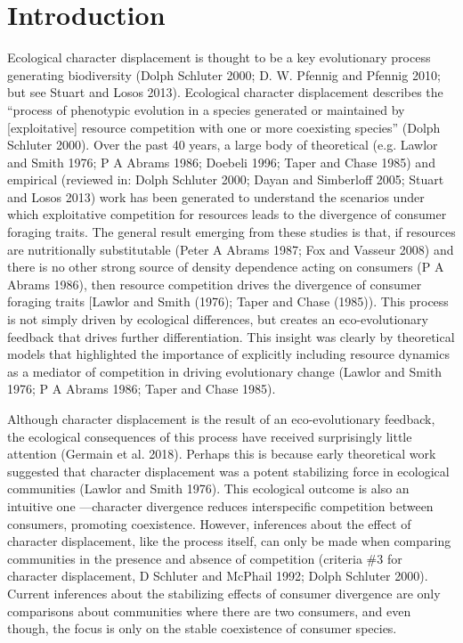 \documentclass[11pt,]{article}
\begin{document}
\newpage

\section{Introduction}\label{introduction}

Ecological character displacement is thought to be a key evolutionary
process generating biodiversity (Dolph Schluter 2000; D. W. Pfennig and
Pfennig 2010; but see Stuart and Losos 2013). Ecological character
displacement describes the ``process of phenotypic evolution in a
species generated or maintained by {[}exploitative{]} resource
competition with one or more coexisting species'' (Dolph Schluter 2000).
Over the past 40 years, a large body of theoretical (e.g. Lawlor and
Smith 1976; P A Abrams 1986; Doebeli 1996; Taper and Chase 1985) and
empirical (reviewed in: Dolph Schluter 2000; Dayan and Simberloff 2005;
Stuart and Losos 2013) work has been generated to understand the
scenarios under which exploitative competition for resources leads to
the divergence of consumer foraging traits. The general result emerging
from these studies is that, if resources are nutritionally substitutable
(Peter A Abrams 1987; Fox and Vasseur 2008) and there is no other strong
source of density dependence acting on consumers (P A Abrams 1986), then
resource competition drives the divergence of consumer foraging traits
{[}Lawlor and Smith (1976); Taper and Chase (1985)). This process is not
simply driven by ecological differences, but creates an eco-evolutionary
feedback that drives further differentiation. This insight was clearly
by theoretical models that highlighted the importance of explicitly
including resource dynamics as a mediator of competition in driving
evolutionary change (Lawlor and Smith 1976; P A Abrams 1986; Taper and
Chase 1985).

Although character displacement is the result of an eco-evolutionary
feedback, the ecological consequences of this process have received
surprisingly little attention (Germain et al. 2018). Perhaps this is
because early theoretical work suggested that character displacement was
a potent stabilizing force in ecological communities (Lawlor and Smith
1976). This ecological outcome is also an intuitive one ---character
divergence reduces interspecific competition between consumers,
promoting coexistence. However, inferences about the effect of character
displacement, like the process itself, can only be made when comparing
communities in the presence and absence of competition (criteria \#3 for
character displacement, D Schluter and McPhail 1992; Dolph Schluter
2000). Current inferences about the stabilizing effects of consumer
divergence are only comparisons about communities where there are two
consumers, and even though, the focus is only on the stable coexistence
of consumer species.
\end{document}
